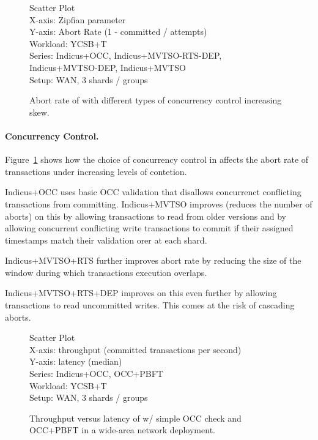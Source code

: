 \begin{figure}
  Scatter Plot\\
  X-axis: Zipfian parameter\\
  Y-axis: Abort Rate (1 - committed / attempts)\\
  Workload: YCSB+T\\
  Series: Indicus+OCC, Indicus+MVTSO-RTS-DEP, Indicus+MVTSO-DEP, Indicus+MVTSO\\
  Setup: WAN, 3 shards / groups\\
  \caption{Abort rate of \sys{} with different types of concurrency control
  increasing skew.}
  \label{fig:cc-aborts}
\end{figure}

\paragraph{Concurrency Control.} Figure~\ref{fig:cc-aborts} shows how the choice of concurrency control in
\sys{} affects the abort rate of transactions under increasing levels of 
contetion.

Indicus+OCC uses basic OCC validation that disallows concurrenct conflicting
transactions from committing. Indicus+MVTSO improves (reduces the number of
aborts) on this by allowing transactions to read from older versions and by
allowing concurrent conflicting write transactions to commit if their assigned
timestamps match their validation orer at each shard.

Indicus+MVTSO+RTS further improves abort rate by reducing the size of the window
during which transactions execution overlaps. 

Indicus+MVTSO+RTS+DEP improves on this even further by allowing transactions to
read uncommitted writes. This comes at the risk of cascading aborts.

\begin{figure}
  Scatter Plot\\
  X-axis: throughput (committed transactions per second)\\
  Y-axis: latency (median)\\
  Series: Indicus+OCC, OCC+PBFT\\
  Workload: YCSB+T\\
  Setup: WAN, 3 shards / groups\\
  \caption{Throughput versus latency of \sys{} w/ simple OCC check and
  OCC+PBFT in a wide-area network deployment.}
  \label{fig:to-vs-po-tput-lat}
\end{figure}


